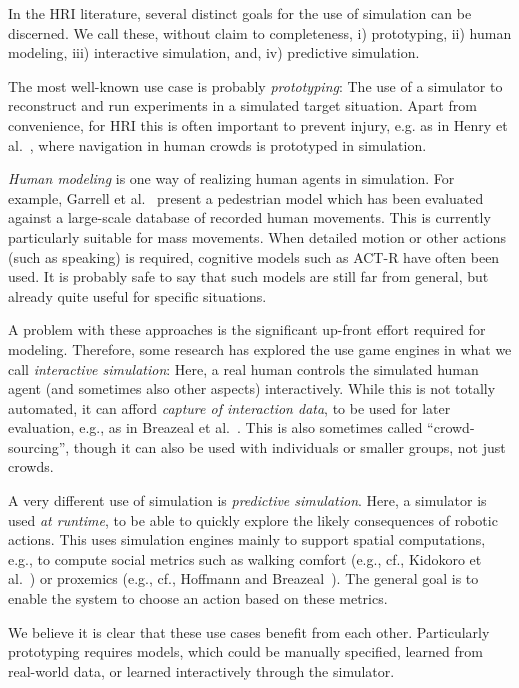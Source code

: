 \documentclass{llncs}
\begin{document}
In the HRI literature, several distinct goals for
the use of simulation can be discerned. We call these, without claim to 
completeness, i) prototyping, ii) human modeling, iii) interactive simulation, 
and, iv) predictive simulation.  

The most well-known use case is probably \emph{prototyping}: The use of a simulator
to reconstruct and run experiments in a simulated target situation. Apart from
convenience, for HRI this is often important to prevent injury, e.g. as in Henry
et al.~\cite{henry2010learning}, where navigation in human crowds is prototyped in 
simulation.

\emph{Human modeling} is one way of realizing human agents in simulation. For example,
Garrell et al.~\cite{garrell2010model} present a pedestrian model which has been
evaluated against a large-scale database of recorded human movements. This is
currently particularly suitable for mass movements. When detailed
motion or other actions (such as speaking) is required, cognitive models such
as ACT-R\cite{} have often been used. It is probably safe to say that such models
are still far from general, but already quite useful for specific situations.

A problem with these approaches is the significant up-front effort
required for modeling. Therefore, some research has explored the use game engines
in what we call \emph{interactive simulation}: Here, a real human controls the simulated
human agent (and sometimes also other aspects) interactively. While this is not
totally automated, it can afford
\emph{capture of interaction data}, to be used for later evaluation, e.g.,
as in Breazeal et al.~\cite{breazeal2013crowdsourcing}. This is also sometimes
called ``crowd-sourcing'', though it can also be used with individuals or smaller
groups, not just crowds.

A very different use of simulation is \emph{predictive simulation}. Here, 
a simulator is used \emph{at runtime}, to
be able to quickly explore the likely consequences of robotic actions. This
uses simulation engines mainly to support spatial computations, e.g.,
to compute social metrics such as walking comfort (e.g., cf., Kidokoro et 
al.~\cite{kidokoro2013will}) or proxemics (e.g., cf., Hoffmann and 
Breazeal~\cite{hoffman2010effects}). The general goal is to enable the system
to choose an action based on these metrics.

We believe it is clear that these use cases benefit from each other. Particularly
prototyping requires models, which could be manually specified, learned from 
real-world data, or learned interactively through the simulator.
\end{document}
